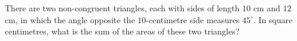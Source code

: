 There are two non-congruent triangles, each with sides of length $10$ cm and $12$ cm, in which the angle opposite the $10$-centimetre side measures $45^\circ$. In square centimetres, what is the sum of the areas of these two triangles?
